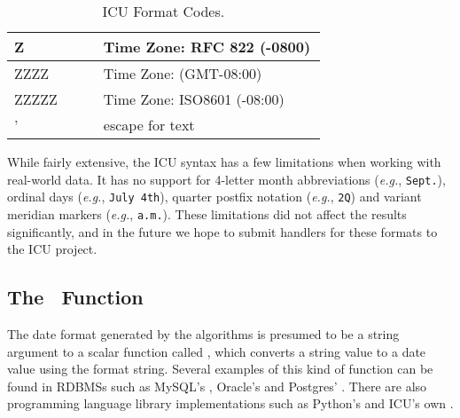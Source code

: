 \begin{table}[ht]
\begin{tabular}{|p{0.2\linewidth}| p{0.5\linewidth}|}
\scriptsize{Z} & \scriptsize{Time Zone: RFC 822 (-0800)}\\ \hline
\scriptsize{ZZZZ} & \scriptsize{Time Zone: (GMT-08:00)}\\ \hline
\scriptsize{ZZZZZ} & \scriptsize{Time Zone: ISO8601 (-08:00)}\\ \hline
    
\scriptsize{'} & \scriptsize{escape for text}\\ \hline

\end{tabular}
\egroup
\caption{ICU Format Codes.}
\label{tab:icuformats}
\end{table}

While fairly extensive, the ICU syntax has a few limitations when working with real-world data. It has no support for 4-letter month abbreviations (\textit{e.g.}, \texttt{Sept.}), ordinal days (\textit{e.g.}, \texttt{July 4th}), quarter postfix notation (\textit{e.g.}, \texttt{2Q}) and variant meridian markers (\textit{e.g.}, \texttt{a.m.}). 
These limitations did not affect the results significantly, and in the future we hope to submit handlers for these formats to the ICU project. 

\subsection{The \dateparse\ Function}

The date format generated by the algorithms is presumed to be a string argument to a scalar function called \dateparse, which converts a string value to a date value using the format string. Several examples of this kind of function can be found in RDBMSs such as MySQL's , Oracle's  and Postgres' . There are also programming language library implementations such as Python's  and ICU's own .
